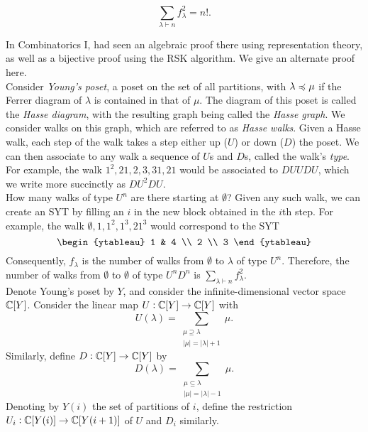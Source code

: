 \begin{ftheo}
	\label{th7.5}
	\[ \sum_{\lambda \vdash n} f_\lambda^2 = n!. \]
\end{ftheo}

In Combinatorics I, had seen an algebraic proof there using representation theory, as well as a bijective proof using the RSK algorithm. We give an alternate proof here.\\
Consider \emph{Young's poset}, a poset on the set of all partitions, with $\lambda \preccurlyeq \mu$ if the Ferrer diagram of $\lambda$ is contained in that of $\mu$. The diagram of this poset is called the \emph{Hasse diagram}, with the resulting graph being called the \emph{Hasse graph}. We consider walks on this graph, which are referred to as \emph{Hasse walks}. Given a Hasse walk, each step of the walk takes a step either up ($U$) or down ($D$) the poset. We can then associate to any walk a sequence of $U$s and $D$s, called the walk's \emph{type}. For example, the walk $1^2,21,2,3,31,21$ would be associated to $DUUDU$, which we write more succinctly as $DU^2DU$.\\

How many walks of type $U^n$ are there starting at $\emptyset$? Given any such walk, we can create an SYT by filling an $i$ in the new block obtained in the $i$th step. For example, the walk $\emptyset,1,1^2,1^3,21^3$ would correspond to the SYT
\[ \begin{ytableau} 1 & 4 \\ 2 \\ 3 \end{ytableau} \]
Consequently, $f_\lambda$ is the number of walks from $\emptyset$ to $\lambda$ of type $U^n$. Therefore, the number of walks from $\emptyset$ to $\emptyset$ of type $U^nD^n$ is $\sum_{\lambda \vdash n} f_\lambda^2$.\\

Denote Young's poset by $Y$, and consider the infinite-dimensional vector space $\mathbb{C}[Y]$. Consider the linear map $U : \mathbb{C}[Y] \to \mathbb{C}[Y]$ with
\[ U(\lambda) = \sum_{\substack{\mu \supseteq \lambda \\ |\mu| = |\lambda|+1}} \mu. \]
Similarly, define $D : \mathbb{C}[Y] \to \mathbb{C}[Y]$ by
\[ D(\lambda) = \sum_{\substack{\mu \subseteq \lambda \\ |\mu| = |\lambda|-1}} \mu. \]
Denoting by $Y(i)$ the set of partitions of $i$, define the restriction $U_i : \mathbb{C}[Y(i)] \to \mathbb{C}[Y(i+1)]$ of $U$ and $D_i$ similarly.

